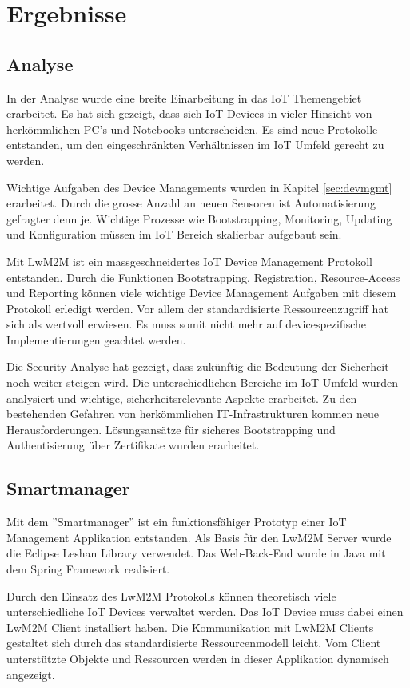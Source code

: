 \chapter{Ergebnisse}
\section{Analyse}
In der Analyse wurde eine breite Einarbeitung in das IoT Themengebiet erarbeitet. Es hat sich gezeigt, dass sich IoT Devices in vieler Hinsicht von herkömmlichen PC's und Notebooks unterscheiden. Es sind neue Protokolle entstanden, um den eingeschränkten Verhältnissen im IoT Umfeld gerecht zu werden.

Wichtige Aufgaben des Device Managements wurden in Kapitel \ref{sec:devmgmt} erarbeitet. Durch die grosse Anzahl an neuen Sensoren ist Automatisierung gefragter denn je. Wichtige Prozesse wie Bootstrapping, Monitoring, Updating und Konfiguration müssen im IoT Bereich skalierbar aufgebaut sein.

Mit LwM2M ist ein massgeschneidertes IoT Device Management Protokoll entstanden. Durch die Funktionen Bootstrapping, Registration, Resource-Access und Reporting können viele wichtige Device Management Aufgaben mit diesem Protokoll erledigt werden. Vor allem der standardisierte Ressourcenzugriff hat sich als wertvoll erwiesen. Es muss somit nicht mehr auf devicespezifische Implementierungen geachtet werden.

Die Security Analyse hat gezeigt, dass zukünftig die Bedeutung der Sicherheit noch weiter steigen wird. Die unterschiedlichen Bereiche im IoT Umfeld wurden analysiert und wichtige, sicherheitsrelevante Aspekte erarbeitet. Zu den bestehenden Gefahren von herkömmlichen IT-Infrastrukturen kommen neue Herausforderungen. Lösungsansätze für sicheres Bootstrapping und Authentisierung über Zertifikate wurden erarbeitet.    

\section{Smartmanager}
Mit dem ''Smartmanager'' ist ein funktionsfähiger Prototyp einer IoT Management Applikation entstanden. Als Basis für den LwM2M Server wurde die Eclipse Leshan Library verwendet. Das Web-Back-End wurde in Java mit dem Spring Framework realisiert. 

Durch den Einsatz des LwM2M Protokolls können theoretisch viele unterschiedliche IoT Devices verwaltet werden. Das IoT Device muss dabei einen LwM2M Client installiert haben. Die Kommunikation mit LwM2M Clients gestaltet sich durch das standardisierte Ressourcenmodell leicht. Vom Client unterstützte Objekte und Ressourcen werden in dieser Applikation dynamisch angezeigt.

